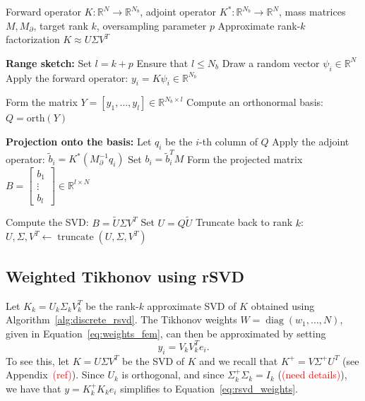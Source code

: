 \begin{algorithm}[!thbp]
\caption{Discrete Operator rSVD Approximation of $K$}
\label{alg:discrete_rsvd}
\begin{algorithmic}[1]
    \Require Forward operator $K: \mathbb{R}^N \to \mathbb{R}^{N_b}$, adjoint operator $K^*: \mathbb{R}^{N_b} \to \mathbb{R}^N$, mass matrices $M, M_\partial$, target rank $k$, oversampling parameter $p$
    \Ensure Approximate rank-$k$ factorization $K \approx U \Sigma V^T$
    
    \State \textbf{Range sketch:}
    \State Set $l = k + p$
    \Comment Ensure that $l \le N_b$
        \State Draw a random vector $\psi_i \in \mathbb{R}^N$
        \State Apply the forward operator: $y_i = K \psi_i \in \mathbb{R}^{N_b}$
    \EndFor

    \State Form the matrix $Y = [y_1, \dots, y_l] \in \mathbb{R}^{N_b \times l}$ 
    \State Compute an orthonormal basis: $Q = \text{orth}(Y)$

    \State \textbf{Projection onto the basis:}
        \State Let $q_i$ be the $i$-th column of $Q$
        \State Apply the adjoint operator: $\tilde b_i = K^* (M_{\partial}^{-1} q_i)$
        \State Set $b_i = \tilde b_i^T M$ 
    \EndFor
    \State Form the projected matrix $B = \begin{bmatrix} b_1 \\ \vdots \\ b_l \end{bmatrix} \in \mathbb{R}^{l \times N}$ 

    \State Compute the SVD: $B = \tilde U \Sigma V^T$
    \State Set $U = Q \tilde U$
    \State Truncate back to rank $k$: $U, \Sigma, V^T \leftarrow \operatorname{truncate}(U, \Sigma, V^T)$
    
\end{algorithmic}
\end{algorithm}


\clearpage
\subsection{Weighted Tikhonov using rSVD}
Let $K_k = U_k \Sigma_k V_k^T$ be the rank-$k$ approximate SVD of $K$ obtained using Algorithm~\ref{alg:discrete_rsvd}. The Tikhonov weights $W = \operatorname{diag}(w_1, \dots, N)$, given in Equation~\eqref{eq:weights_fem}, can then be approximated by setting
\begin{equation}\label{eq:rsvd_weights}
    y_i = V_k V_k^T e_i.
\end{equation}
To see this, let $K = U \Sigma V^T$ be the SVD of $K$ and we recall that $K^+ = V \Sigma^+ U^T$ (see Appendix~\textcolor{red}{(ref)}). Since $U_k$ is orthogonal, and since $\Sigma_k^+ \Sigma_k = I_k$ (\textcolor{red}{(need details)}), we have that $y = K_k^+ K_k e_i$ simplifies to Equation~\eqref{eq:rsvd_weights}.



